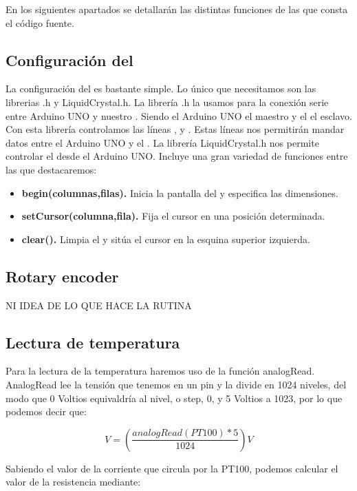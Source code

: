 En los siguientes apartados se detallarán las distintas funciones de las que consta el código fuente.

\subsection{Configuración del } 
La configuración del  es bastante simple. Lo único que necesitamos son las librerias .h y LiquidCrystal.h. 
La librería .h la usamos para la conexión serie entre Arduino UNO y nuestro . Siendo el Arduino UNO el maestro y el  el esclavo. Con esta librería controlamos las líneas ,  y . Estas líneas nos permitirán mandar datos entre el Arduino UNO y el .
La librería LiquidCrystal.h nos permite controlar el  desde el Arduino UNO. Incluye una gran variedad de funciones entre las que destacaremos:

\begin{itemize}
\item \textbf{begin(columnas,filas).} Inicia la pantalla del  y especifica las dimensiones.
\item \textbf{setCursor(columna,fila).} Fija el cursor en una posición determinada.
\item \textbf{clear().} Limpia el  y sitúa el cursor en la esquina superior izquierda.
\end{itemize}

\subsection{Rotary encoder}
NI IDEA DE LO QUE HACE LA RUTINA


\subsection{Lectura de temperatura}
Para la lectura de la temperatura haremos uso de la función analogRead. AnalogRead lee la tensión que tenemos en un pin y la divide en 1024 niveles, del modo que 0 Voltios equivaldría al nivel, o step, 0, y 5 Voltios a 1023, por lo que podemos decir que: 

\begin{equation}
V=\left(\frac{analogRead(PT100)*5}{1024}\right) V
\end{equation}

Sabiendo el valor de la corriente que circula por la PT100, podemos calcular el valor de la resistencia mediante:

